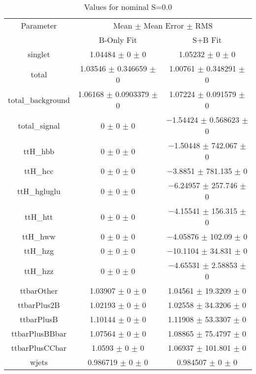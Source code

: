 \begin{table}
\centering
\caption{Values for nominal S=0.0}
\begin{tabular}{ccc}
\toprule
Parameter & \multicolumn{2}{c}{Mean $\pm$ Mean Error $\pm$ RMS}\\
 & B-Only Fit & S+B Fit\\
\midrule
singlet & \num{1.04484} $\pm$ \num{0} $\pm$ \num{0} & \num{1.05232} $\pm$ \num{0} $\pm$ \num{0}\\
total & \num{1.03546} $\pm$ \num{0.346659} $\pm$ \num{0} & \num{1.00761} $\pm$ \num{0.348291} $\pm$ \num{0}\\
total\_background & \num{1.06168} $\pm$ \num{0.0903379} $\pm$ \num{0} & \num{1.07224} $\pm$ \num{0.091579} $\pm$ \num{0}\\
total\_signal & \num{0} $\pm$ \num{0} $\pm$ \num{0} & \num{-1.54424} $\pm$ \num{0.568623} $\pm$ \num{0}\\
ttH\_hbb & \num{0} $\pm$ \num{0} $\pm$ \num{0} & \num{-1.50448} $\pm$ \num{742.067} $\pm$ \num{0}\\
ttH\_hcc & \num{0} $\pm$ \num{0} $\pm$ \num{0} & \num{-3.8851} $\pm$ \num{781.135} $\pm$ \num{0}\\
ttH\_hgluglu & \num{0} $\pm$ \num{0} $\pm$ \num{0} & \num{-6.24957} $\pm$ \num{257.746} $\pm$ \num{0}\\
ttH\_htt & \num{0} $\pm$ \num{0} $\pm$ \num{0} & \num{-4.15541} $\pm$ \num{156.315} $\pm$ \num{0}\\
ttH\_hww & \num{0} $\pm$ \num{0} $\pm$ \num{0} & \num{-4.05876} $\pm$ \num{102.09} $\pm$ \num{0}\\
ttH\_hzg & \num{0} $\pm$ \num{0} $\pm$ \num{0} & \num{-10.1104} $\pm$ \num{34.831} $\pm$ \num{0}\\
ttH\_hzz & \num{0} $\pm$ \num{0} $\pm$ \num{0} & \num{-4.65531} $\pm$ \num{2.58853} $\pm$ \num{0}\\
ttbarOther & \num{1.03907} $\pm$ \num{0} $\pm$ \num{0} & \num{1.04561} $\pm$ \num{19.3209} $\pm$ \num{0}\\
ttbarPlus2B & \num{1.02193} $\pm$ \num{0} $\pm$ \num{0} & \num{1.02558} $\pm$ \num{34.3206} $\pm$ \num{0}\\
ttbarPlusB & \num{1.10144} $\pm$ \num{0} $\pm$ \num{0} & \num{1.11908} $\pm$ \num{53.3307} $\pm$ \num{0}\\
ttbarPlusBBbar & \num{1.07564} $\pm$ \num{0} $\pm$ \num{0} & \num{1.08865} $\pm$ \num{75.4797} $\pm$ \num{0}\\
ttbarPlusCCbar & \num{1.0593} $\pm$ \num{0} $\pm$ \num{0} & \num{1.06937} $\pm$ \num{101.801} $\pm$ \num{0}\\
wjets & \num{0.986719} $\pm$ \num{0} $\pm$ \num{0} & \num{0.984507} $\pm$ \num{0} $\pm$ \num{0}\\
\bottomrule
\end{tabular}
\end{table}
